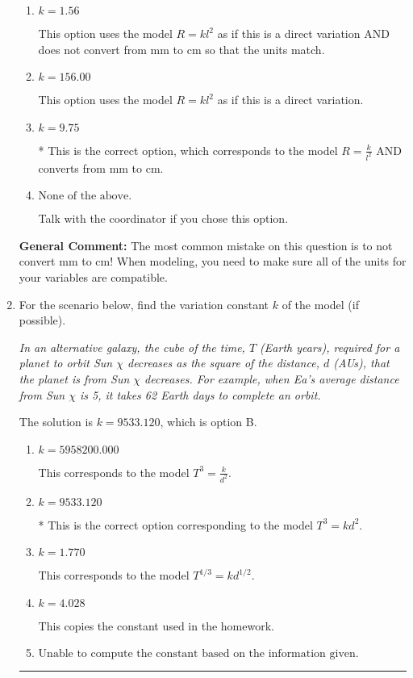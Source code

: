 \documentclass{extbook}[14pt]
\newcommand{\litem}[1]{\item #1

\rule{\textwidth}{0.4pt}}
\begin{document}
\begin{enumerate}
{\begin{enumerate}[label=\Alph*.]
This option uses the correct model, $R = \frac{k}{l^{2}}$, but does not convert from mm to cm so that the units match.
\item \( k = 1.56 \)

This option uses the model $R = kl^{2}$ as if this is a direct variation AND does not convert from mm to cm so that the units match.
\item \( k = 156.00 \)

This option uses the model $R = kl^{2}$ as if this is a direct variation.
\item \( k = 9.75 \)

* This is the correct option, which corresponds to the model $R = \frac{k}{l^{2}}$ AND converts from mm to cm.
\item \( \text{None of the above.} \)

Talk with the coordinator if you chose this option.
\end{enumerate}

\textbf{General Comment:} The most common mistake on this question is to not convert mm to cm! When modeling, you need to make sure all of the units for your variables are compatible.
}
\litem{
For the scenario below, find the variation constant $k$ of the model (if possible).

\begin{center}
    \textit{ In an alternative galaxy, the cube of the time, $T$ (Earth years), required for a planet to orbit Sun $\chi$ decreases as the square of the distance, $d$ (AUs), that the planet is from Sun $\chi$ decreases. For example, when Ea's average distance from Sun $\chi$ is 5, it takes 62 Earth days to complete an orbit. }
\end{center}
The solution is \( k = 9533.120 \), which is option B.\begin{enumerate}[label=\Alph*.]
\item \( k = 5958200.000 \)

This corresponds to the model $T^{3} = \frac{k}{d^{2}}$.
\item \( k = 9533.120 \)

* This is the correct option corresponding to the model $T^{3} = k d^{2}$.
\item \( k = 1.770 \)

This corresponds to the model $T^{1/3} = k d^{1/2}$.
\item \( k = 4.028 \)

This copies the constant used in the homework.
\item \( \text{Unable to compute the constant based on the information given.} \)


\end{enumerate}}
\end{enumerate}
\end{document}
